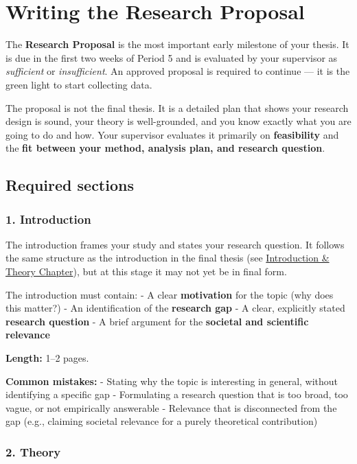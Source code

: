 \documentclass[
  11pt,
  a4paper,
]{scrbook}
\begin{document}
\chapter{Writing the Research
Proposal}\label{writing-the-research-proposal}

The \textbf{Research Proposal} is the most important early milestone of
your thesis. It is due in the first two weeks of Period 5 and is
evaluated by your supervisor as \emph{sufficient} or
\emph{insufficient}. An approved proposal is required to continue --- it
is the green light to start collecting data.

The proposal is not the final thesis. It is a detailed plan that shows
your research design is sound, your theory is well-grounded, and you
know exactly what you are going to do and how. Your supervisor evaluates
it primarily on \textbf{feasibility} and the \textbf{fit between your
method, analysis plan, and research question}.

\section{Required sections}\label{required-sections}

\subsection{1. Introduction}\label{introduction}

The introduction frames your study and states your research question. It
follows the same structure as the introduction in the final thesis (see
\href{writing-intro-theory.qmd}{Introduction \& Theory Chapter}), but at
this stage it may not yet be in final form.

The introduction must contain: - A clear \textbf{motivation} for the
topic (why does this matter?) - An identification of the
\textbf{research gap} - A clear, explicitly stated \textbf{research
question} - A brief argument for the \textbf{societal and scientific
relevance}

\textbf{Length:} 1--2 pages.

\textbf{Common mistakes:} - Stating why the topic is interesting in
general, without identifying a specific gap - Formulating a research
question that is too broad, too vague, or not empirically answerable -
Relevance that is disconnected from the gap (e.g., claiming societal
relevance for a purely theoretical contribution)

\subsection{2. Theory}\label{theory}
\end{document}
